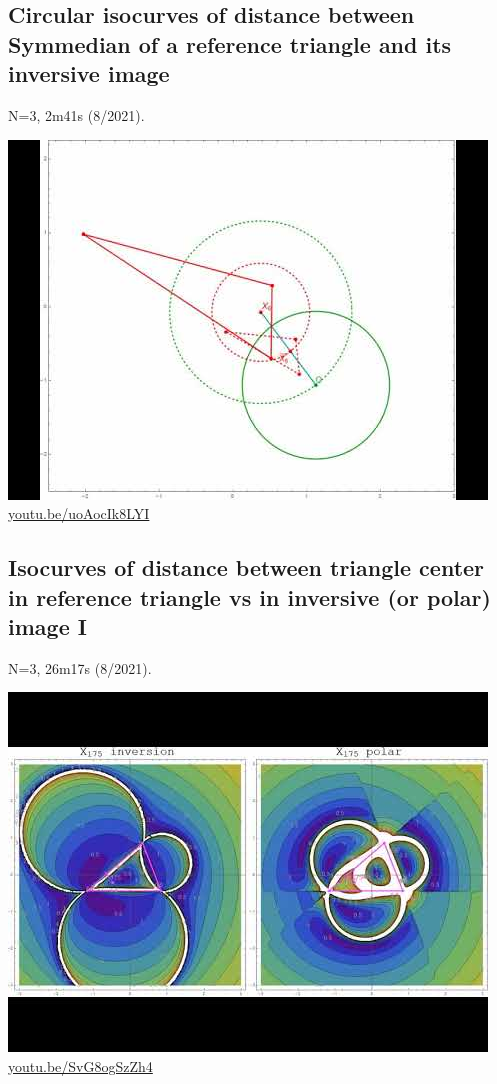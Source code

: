 \documentclass[12pt]{amsart}
\begin{document}
\subsection{Circular isocurves of distance between Symmedian of a reference triangle and its inversive image}
\label{vid:uoAocIk8LYI}
\noindent N=3, 2m41s (8/2021). 
\begin{center}\includegraphics[width=.5\textwidth]{pics/uoAocIk8LYI.jpg} \\ 
\href{https://youtu.be/uoAocIk8LYI}{\url{youtu.be/uoAocIk8LYI}}\end{center}
% 

\subsection{Isocurves of distance between triangle center in reference triangle vs in inversive (or polar) image I}
\label{vid:SvG8ogSzZh4}
\noindent N=3, 26m17s (8/2021). 
\begin{center}\includegraphics[width=.5\textwidth]{pics/SvG8ogSzZh4.jpg} \\ 
\href{https://youtu.be/SvG8ogSzZh4}{\url{youtu.be/SvG8ogSzZh4}}\end{center}
% 
\end{document}
